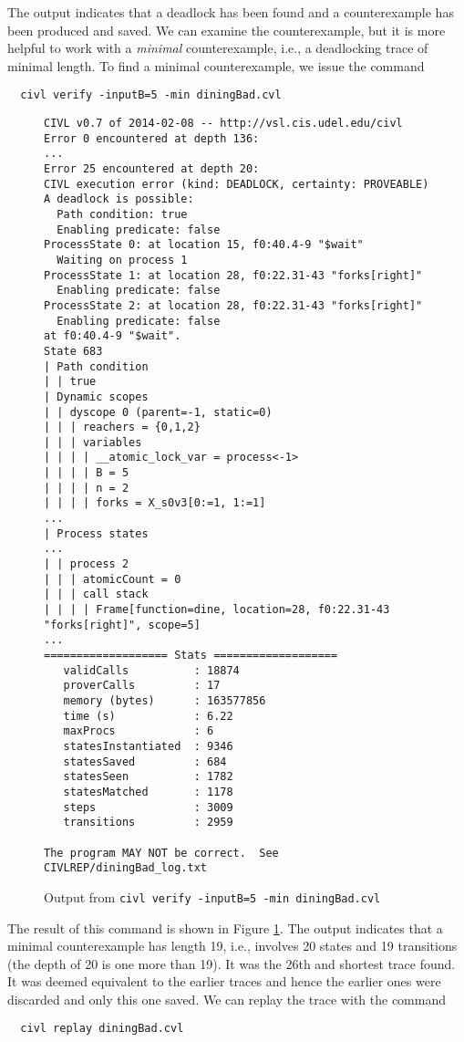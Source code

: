 The output indicates that a deadlock has been found and a
counterexample has been produced and saved. We can examine the
counterexample, but it is more helpful to work with a \emph{minimal}
counterexample, i.e., a deadlocking trace of minimal length. To find a
minimal counterexample, we issue the command

\begin{verbatim}
  civl verify -inputB=5 -min diningBad.cvl
\end{verbatim}

\begin{figure}[t]
  \begin{small}
\begin{verbatim}
CIVL v0.7 of 2014-02-08 -- http://vsl.cis.udel.edu/civl
Error 0 encountered at depth 136:
...
Error 25 encountered at depth 20:
CIVL execution error (kind: DEADLOCK, certainty: PROVEABLE)
A deadlock is possible:
  Path condition: true
  Enabling predicate: false
ProcessState 0: at location 15, f0:40.4-9 "$wait"
  Waiting on process 1
ProcessState 1: at location 28, f0:22.31-43 "forks[right]"
  Enabling predicate: false
ProcessState 2: at location 28, f0:22.31-43 "forks[right]"
  Enabling predicate: false
at f0:40.4-9 "$wait".
State 683
| Path condition
| | true
| Dynamic scopes
| | dyscope 0 (parent=-1, static=0)
| | | reachers = {0,1,2}
| | | variables
| | | | __atomic_lock_var = process<-1>
| | | | B = 5
| | | | n = 2
| | | | forks = X_s0v3[0:=1, 1:=1]
...
| Process states
...
| | process 2
| | | atomicCount = 0
| | | call stack
| | | | Frame[function=dine, location=28, f0:22.31-43 "forks[right]", scope=5]
...
=================== Stats ===================
   validCalls          : 18874
   proverCalls         : 17
   memory (bytes)      : 163577856
   time (s)            : 6.22
   maxProcs            : 6
   statesInstantiated  : 9346
   statesSaved         : 684
   statesSeen          : 1782
   statesMatched       : 1178
   steps               : 3009
   transitions         : 2959

The program MAY NOT be correct.  See CIVLREP/diningBad_log.txt
\end{verbatim}
  \end{small}
  \caption{Output from \texttt{civl verify -inputB=5 -min diningBad.cvl}}
  \label{fig:diningOut}
\end{figure}

The result of this command is shown in Figure \ref{fig:diningOut}. The
output indicates that a minimal counterexample has length 19, i.e.,
involves 20 states and 19 transitions (the depth of 20 is one more
than 19).    It was the 26th and shortest trace found.  It was deemed
equivalent to the earlier traces and hence the earlier ones were
discarded and only this one saved.  We can replay the trace with the command
\begin{verbatim}
  civl replay diningBad.cvl
\end{verbatim}


